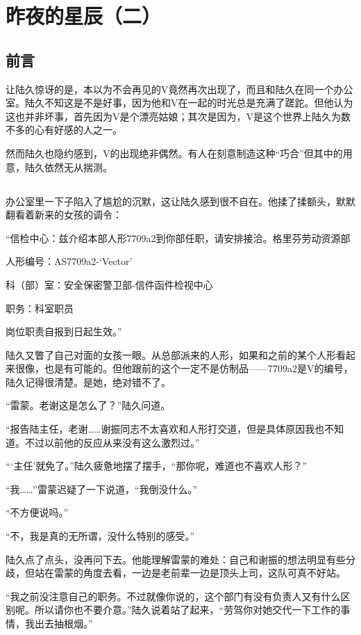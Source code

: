 \chapter{昨夜的星辰（二）}
\section*{前言}
让陆久惊讶的是，本以为不会再见的V竟然再次出现了，而且和陆久在同一个办公室。陆久不知这是不是好事，因为他和V在一起的时光总是充满了蹉跎。但他认为这也并非坏事，首先因为V是个漂亮姑娘；其次是因为，V是这个世界上陆久为数不多的心有好感的人之一。

然而陆久也隐约感到，V的出现绝非偶然。有人在刻意制造这种“巧合”但其中的用意，陆久依然无从揣测。

\lineseparator

\section*{}

办公室里一下子陷入了尴尬的沉默，这让陆久感到很不自在。他揉了揉额头，默默翻看着新来的女孩的调令：

“信检中心：兹介绍本部人形7709a2到你部任职，请安排接洽。格里芬劳动资源部

人形编号：AS7709a2-‘Vector’

科（部）室：安全保密警卫部-信件函件检视中心

职务：科室职员

岗位职责自报到日起生效。”

陆久又瞥了自己对面的女孩一眼。从总部派来的人形，如果和之前的某个人形看起来很像，也是有可能的。但他跟前的这个一定不是仿制品——7709a2是V的编号，陆久记得很清楚。是她，绝对错不了。

“雷蒙。老谢这是怎么了？”陆久问道。

“报告陆主任，老谢……谢振同志不太喜欢和人形打交道，但是具体原因我也不知道。不过以前他的反应从来没有这么激烈过。”

“‘主任’就免了。”陆久疲惫地摆了摆手，“那你呢，难道也不喜欢人形？”

“我……”雷蒙迟疑了一下说道，“我倒没什么。”

“不方便说吗。”

“不，我是真的无所谓，没什么特别的感受。”

陆久点了点头，没再问下去。他能理解雷蒙的难处：自己和谢振的想法明显有些分歧，但站在雷蒙的角度去看，一边是老前辈一边是顶头上司，这队可真不好站。

“我之前没注意自己的职务。不过就像你说的，这个部门有没有负责人又有什么区别呢。所以请你也不要介意。”陆久说着站了起来，“劳驾你对她交代一下工作的事情，我出去抽根烟。”

